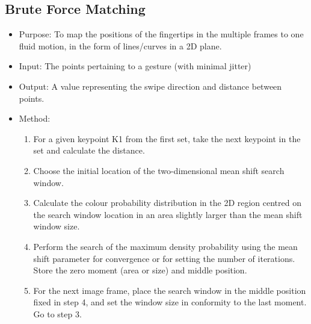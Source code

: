 \documentclass[11pt]{report}
\begin{document}
\subsection{Brute Force Matching}
\begin{itemize}
    \item Purpose: To map the positions of the fingertips in the multiple frames to one fluid motion, in the form of lines/curves in a 2D plane.
    \item Input: The points pertaining to a gesture (with minimal jitter)
    \item Output: A value representing the swipe direction and distance between points.
    \item Method:
    \begin{enumerate}
        \item For a given keypoint K1 from the first set, take the next keypoint in the set and calculate the distance.
        \item Choose the initial location of the two-dimensional mean shift search window.
        \item Calculate the colour probability distribution in the 2D region centred on the search window location in an area slightly larger than the mean shift window size.
        \item Perform the search of the maximum density probability using the mean shift parameter for convergence or for setting the number of iterations. Store the zero moment (area or size) and middle position.
        \item For the next image frame, place the search window in the middle position fixed in step 4, and set the window size in conformity to the last moment. Go to step 3. 
    \end{enumerate}
\end{itemize}
\end{document}
